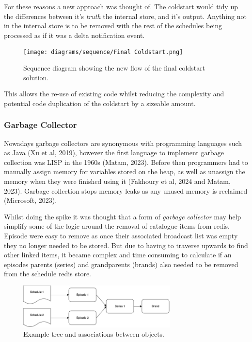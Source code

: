   For these reasons a new approach was thought of. The coldstart would tidy up the differences between it's \textit{truth} the internal store, and 
  it's output. Anything not in the internal store is to be removed with the rest of the schedules being processed as if it was a delta notification 
  event.

  \begin{figure}[H]
    \centering
    \texttt{[image: diagrams/sequence/Final Coldstart.png]}
    \caption{Sequence diagram showing the new flow of the final coldstart solution.}
    \label{fig:finalColdstart}
  \end{figure}

  This allows the re-use of existing code whilst reducing the complexity and potential code duplication of the coldstart by a sizeable amount.

  \newpage
  \subsubsection{Garbage Collector}
  Nowadays garbage collectors are synonymous with programming languages such as Java (Xu et al, 2019), however the first language to implement garbage 
  collection was LISP in the 1960s (Matam, 2023). Before then programmers had to manually assign memory for variables stored on the heap, as well as 
  unassign the memory when they were finished using it (Fakhoury et al, 2024 and Matam, 2023). 
  Garbage collection stops memory leaks as any unused memory is reclaimed (Microsoft, 2023).

  Whilst doing the spike it was thought that a form of \textit{garbage collector} may help simplify some of the logic around the removal of catalogue items
  from redis. Episode were easy to remove as once their associated broadcast list was empty they no longer needed to be stored. But due to having to 
  traverse upwards to find other linked items, it became complex and time consuming to calculate if an episodes parents (series) and grandparents (brands)
  also needed to be removed from the schedule redis store.

  \begin{figure}[H]
    \centering
    \includegraphics[width=8cm]{assets/catalogueTree.drawio.png}
    \caption{Example tree and associations between objects.}
    \label{fig:catalogueTree}
  \end{figure}

